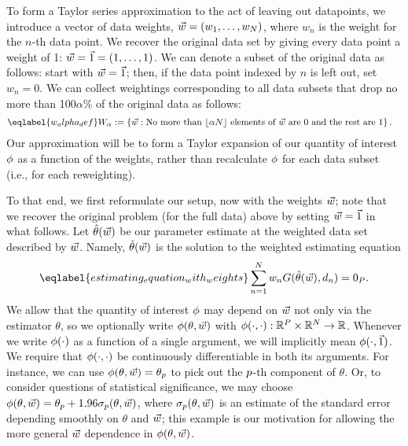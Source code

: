 To form a Taylor series approximation to the act of leaving out datapoints, we
introduce a vector of data weights, $\vec{w} = (w_1, \ldots, w_N)$, where $w_n$ is
the weight for the $n$-th data point. We recover the original data set by giving
every data point a weight of 1: $\vec{w} = \vec{1} = (1, \ldots, 1)$. We can denote a
subset of the original data as follows: start with $\vec{w} = \vec{1}$; then, if the
data point indexed by $n$ is left out, set $w_n = 0$. We can collect weightings
corresponding to all data subsets that drop no more than 100$\alpha$\% of the
original data as follows:
%
\begin{align}\eqlabel{w_alpha_def}
	W_\alpha &:=
	\left\{ \w : \textrm{No more than }
 		   \lfloor \alpha N \rfloor \textrm{ elements of } \w \textrm{ are } 0
			\textrm{ and the rest are } 1 \right\}.
\end{align}
%
Our approximation will be to form a Taylor expansion of our quantity of interest
$\phi$ as a function of the weights, rather than recalculate $\phi$
for each data subset (i.e., for each reweighting).

To that end, we first reformulate our setup, now with the weights $\vec{w}$; note
that we recover the original problem (for the full data) above by setting
$\vec{w}=\vec{1}$ in what follows. Let $\hat{\theta}(\vec{w})$ be our parameter estimate at
the weighted data set described by $\vec{w}$. Namely, $\hat{\theta}(\vec{w})$ is the solution
to the weighted estimating equation
%
\begin{align} \eqlabel{estimating_equation_with_weights}
	\sumn w_n G(\thetahat(\w), \d_{n}) = \zP.
\end{align}
%
We allow that the quantity of interest $\phi$ may depend on $\vec{w}$ not only
via the estimator $\theta$, so we optionally write $\phi(\theta, \vec{w})$
with $\phi(\cdot,\cdot): \mathbb{R}^{P} \times \mathbb{R}^N \rightarrow
\mathbb{R}$.  Whenever we write $\phi(\cdot)$ as a function of a single
argument, we will implicitly mean $\phi(\cdot, \vec{1})$.
%
We require that $\phi(\cdot,\cdot)$ be continuously differentiable in both
its arguments. For instance, we can use $\phi(\theta,\vec{w}) = \theta_{p}$ to
pick out the $p$-th component of $\theta$. Or, to consider questions of
statistical significance, we may choose $\phi(\theta,\vec{w}) = \theta_{p} +
1.96 \sigma_{p}(\theta,\vec{w})$, where $\sigma_{p}(\theta,\vec{w})$ is an estimate of
the standard error depending smoothly on $\theta$ and $\vec{w}$; this example is our
motivation for allowing the more general $\vec{w}$ dependence in $\phi(\theta,
\vec{w})$.

